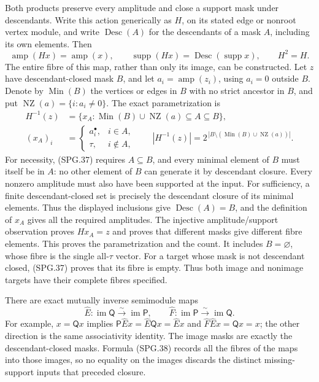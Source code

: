 Both products preserve every amplitude and close a support mask under
descendants. Write this action generically as \(H\), on its stated
edge or nonroot vertex module, and write
\(\operatorname{Desc}(A)\) for the descendants of a mask \(A\),
including its own elements. Then
\[
 \operatorname{amp}(Hx)=\operatorname{amp}(x),\qquad
 \operatorname{supp}(Hx)=\operatorname{Desc}(\operatorname{supp}x),
 \qquad H^2=H.
 \tag{SPG.37}\label{GraphV2:eq:spg-mask-closure}
\]
The entire fibre of this map, rather than only its image, can be
constructed. Let \(z\) have descendant-closed mask \(B\), and
let \(a_i=\operatorname{amp}(z_i)\), using \(a_i=0\) outside
\(B\). Denote by \(\operatorname{Min}(B)\) the vertices or edges
in \(B\) with no strict ancestor in \(B\), and put
\(\operatorname{NZ}(a)=\{i:a_i\ne0\}\). The exact parametrization
is
\[
 \begin{split}
 H^{-1}(z)&=\{x_A:
       \operatorname{Min}(B)\cup\operatorname{NZ}(a)
                                  \subseteq A\subseteq B\},\\
 (x_A)_i&=
   \begin{cases}a_i^\bullet,&i\in A,\\ \tau,&i\notin A,\end{cases}
 \qquad
 |H^{-1}(z)|=2^{\,|B\setminus
       (\operatorname{Min}(B)\cup\operatorname{NZ}(a))|}.
 \end{split}
 \tag{SPG.38}\label{GraphV2:eq:spg-full-fibre}
\]
For necessity, (SPG.37) requires \(A\subseteq B\), and every
minimal element of \(B\) must itself be in \(A\): no other
element of \(B\) can generate it by descendant closure.
Every nonzero amplitude must also have been supported at the input.
For sufficiency, a finite descendant-closed set is precisely the
descendant closure of its minimal elements. Thus the displayed
inclusions give \(\operatorname{Desc}(A)=B\), and the definition
of \(x_A\) gives all the required amplitudes. The injective
amplitude/support observation proves \(Hx_A=z\) and proves that
different masks give different fibre elements. This proves the
parametrization and the count. It includes \(B=\varnothing\),
whose fibre is the single all-\(\tau\) vector.
For a target whose mask is not descendant closed, (SPG.37) proves
that its fibre is empty. Thus both image and nonimage targets have
their complete fibres specified.

There are exact mutually inverse semimodule maps
\[
 \widehat E:\operatorname{im}\mathsf Q
                     \xrightarrow{\sim}\operatorname{im}\mathsf P,
 \qquad
 \widehat F:\operatorname{im}\mathsf P
                     \xrightarrow{\sim}\operatorname{im}\mathsf Q.
 \tag{SPG.39}\label{GraphV2:eq:spg-retract-isomorphism}
\]
For example, \(x=\mathsf Qx\) implies
\(\mathsf P\widehat Ex=\widehat E\mathsf Qx=\widehat Ex\)
and \(\widehat F\widehat Ex=\mathsf Qx=x\); the other direction
is the same associativity identity. The image masks are exactly the
descendant-closed masks. Formula (SPG.38) records all the fibres of
the maps into those images, so no equality on the images discards
the distinct missing-support inputs that preceded closure.

